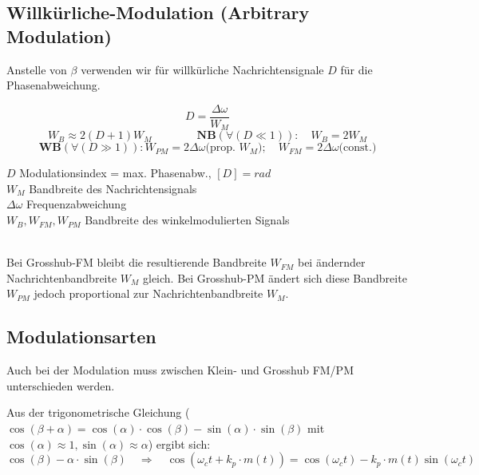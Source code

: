 \subsection{Willkürliche-Modulation (Arbitrary Modulation) }
Anstelle von $\beta$ verwenden wir für willkürliche Nachrichtensignale $D$ für die
Phasenabweichung.\\ 
\begin{minipage}[t][2.7cm][c]{10cm}
	$$ D = \frac{\Delta \omega}{W_M} $$	
$$W_B \approx 2(D + 1) W_M \qquad \qquad 
	\textbf{NB}(\forall (D \ll 1)): \quad W_{B} = 2 W_M $$
 $$ \textbf{WB} (\forall (D \gg 1)): W_{PM} = 2 \Delta \omega \text{(prop. $W_M$)};
 \quad W_{FM} = 2 \Delta \omega \text{(const.)} $$
\end{minipage} \hspace{0.6cm}
\begin{minipage}[t][2.7cm][c]{8cm} 
	$D$ Modulationsindex = max. Phasenabw., $[D] = rad$ \\
	$W_M$ Bandbreite des Nachrichtensignals \\
	$\Delta \omega$ Frequenzabweichung \\
	$W_B,W_{FM},W_{PM}$ Bandbreite des winkelmodulierten Signals
\end{minipage} \\
Bei Grosshub-FM bleibt die resultierende Bandbreite $W_{FM}$ bei ändernder Nachrichtenbandbreite
$W_M$ gleich. Bei Grosshub-PM ändert sich diese Bandbreite$W_{PM}$ jedoch proportional zur
Nachrichtenbandbreite $W_M$.\\


\subsection{Modulationsarten}
Auch bei der Modulation muss zwischen Klein- und Grosshub FM/PM unterschieden werden.


Aus der trigonometrische Gleichung ($\cos(\beta + \alpha) = \cos(\alpha) \cdot \cos(\beta) -
\sin(\alpha) \cdot \sin(\beta)$ mit $\cos(\alpha) \approx 1, \sin(\alpha) \approx \alpha$) ergibt
sich: \\
$$\cos(\beta) - \alpha \cdot \sin(\beta) \quad \Rightarrow \quad \cos(\omega_c t + k_p \cdot m(t))
= \cos(\omega_c t) - k_p \cdot m(t) \sin(\omega_c t)$$

